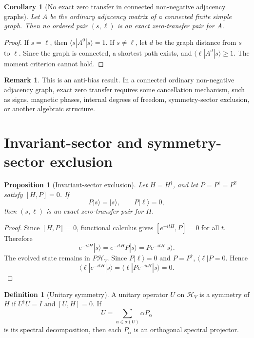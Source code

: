 \documentclass[11pt]{article}
\newtheorem{proposition}[theorem]{Proposition}
\newtheorem{corollary}[theorem]{Corollary}
\theoremstyle{definition}
\newtheorem{definition}[theorem]{Definition}
\newtheorem{remark}[theorem]{Remark}
\newcommand{\cH}{\mathcal H}
\begin{document}
\begin{corollary}[No exact zero transfer in connected non-negative adjacency graphs]
Let $A$ be the ordinary adjacency matrix of a connected finite simple graph. Then no ordered pair $(s,\ell)$ is an exact zero-transfer pair for $A$.
\end{corollary}

\begin{proof}
If $s=\ell$, then $\langle s|A^0|s\rangle=1$. If $s\ne\ell$, let $d$ be the graph distance from $s$ to $\ell$. Since the graph is connected, a shortest path exists, and $\langle \ell|A^d|s\rangle\ge1$. The moment criterion cannot hold.
\end{proof}

\begin{remark}
This is an anti-bias result. In a connected ordinary non-negative adjacency graph, exact zero transfer requires some cancellation mechanism, such as signs, magnetic phases, internal degrees of freedom, symmetry-sector exclusion, or another algebraic structure.
\end{remark}

\section{Invariant-sector and symmetry-sector exclusion}
\begin{proposition}[Invariant-sector exclusion]
Let $H=H^\dagger$, and let $P=P^\dagger=P^2$ satisfy $[H,P]=0$. If
\[
P|s\rangle=|s\rangle,\qquad P|\ell\rangle=0,
\]
then $(s,\ell)$ is an exact zero-transfer pair for $H$.
\end{proposition}

\begin{proof}
Since $[H,P]=0$, functional calculus gives $[e^{-itH},P]=0$ for all $t$. Therefore
\[
e^{-itH}|s\rangle=e^{-itH}P|s\rangle=P e^{-itH}|s\rangle.
\]
The evolved state remains in $P\cH_V$. Since $P|\ell\rangle=0$ and $P=P^\dagger$, $\langle \ell|P=0$. Hence
\[
\langle \ell|e^{-itH}|s\rangle=\langle \ell|P e^{-itH}|s\rangle=0.
\]
\end{proof}

\begin{definition}[Unitary symmetry]
A unitary operator $U$ on $\cH_V$ is a symmetry of $H$ if $U^\dagger U=I$ and $[U,H]=0$. If
\[
U=\sum_{\alpha\in\sigma(U)}\alpha P_\alpha
\]
is its spectral decomposition, then each $P_\alpha$ is an orthogonal spectral projector.
\end{definition}
\end{document}
